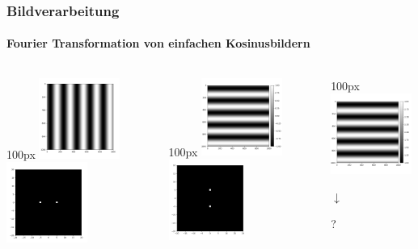 \begin{frame}
    \frametitle{Bildverarbeitung}
    \framesubtitle{Fourier Transformation von einfachen Kosinusbildern}
    \begin{columns}[t]
        \begin{column}{100px}
            \centering
            \includegraphics[width=100px]{images/04-applications-image-cos.png}
            \downarrow
            \includegraphics[width=100px]{images/04-applications-image-cos-ft.png}
        \end{column}
        \begin{column}{100px}
            \centering
            \includegraphics[width=100px]{images/04-applications-image-cos-rot.png}
            \downarrow
            \includegraphics[width=100px]{images/04-applications-image-cos-rot-ft.png}
        \end{column}
        \begin{column}{100px}
            \centering
            \includegraphics[width=100px]{images/04-applications-image-cos-rot-dc.png}
        \begin{tcolorbox}[halign=center, colback=white, boxrule=0pt, colframe=white, enlarge top by=-0.45cm]
            $\downarrow$ 

            \vspace{30px}
            \LARGE{?}
            \end{tcolorbox}
        \end{column}
    \end{columns}
\end{frame}

